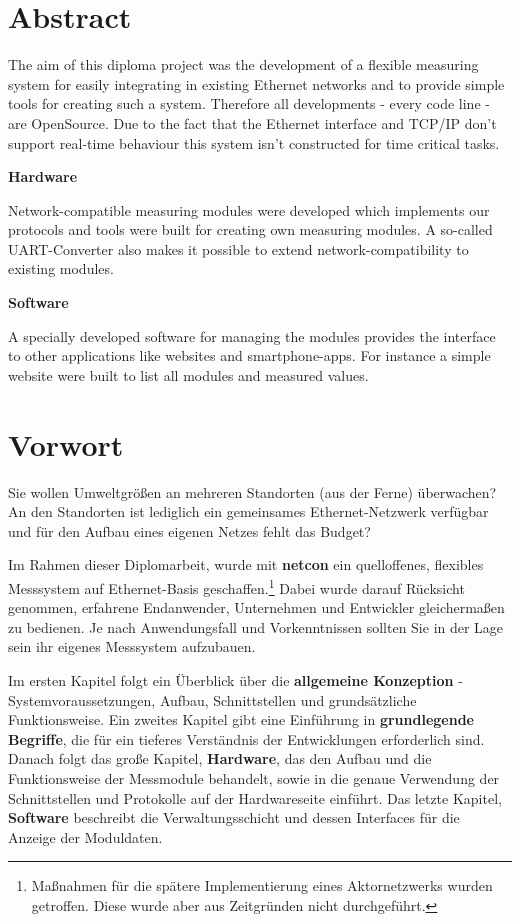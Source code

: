 \documentclass[a4paper,14pt,headsepline]{scrartcl}
\begin{document}
\section*{Abstract}
The aim of this diploma project was the development of a flexible measuring system for easily integrating in existing Ethernet networks and to provide simple tools for creating such a system. Therefore all developments - every code line - are OpenSource. Due to the fact that the Ethernet interface and TCP/IP don't support real-time behaviour this system isn't constructed for time critical tasks. 

\textbf{Hardware}

Network-compatible measuring modules were developed which implements our protocols and tools were built for creating own measuring modules. A so-called UART-Converter also makes it possible to extend network-compatibility to existing modules. 

\textbf{Software}

A specially developed software for managing the modules provides the interface to other applications like websites and smartphone-apps. For instance a simple website were built to list all modules and measured values.


\newpage

\section*{Vorwort}
Sie wollen Umweltgrößen an mehreren Standorten (aus der Ferne) überwachen? An den Standorten ist lediglich ein gemeinsames Ethernet-Netzwerk verfügbar und für den Aufbau eines eigenen Netzes fehlt das Budget?

Im Rahmen dieser Diplomarbeit, wurde mit \textbf{netcon} ein quelloffenes, flexibles Messsystem auf Ethernet-Basis geschaffen.\footnote{Maßnahmen für die spätere Implementierung eines Aktornetzwerks wurden getroffen. Diese wurde aber aus Zeitgründen nicht durchgeführt. } Dabei wurde darauf Rücksicht genommen, erfahrene Endanwender, Unternehmen und Entwickler gleichermaßen zu bedienen. Je nach Anwendungsfall und Vorkenntnissen sollten Sie in der Lage sein ihr eigenes Messsystem aufzubauen. 

Im ersten Kapitel folgt ein Überblick über die \textbf{allgemeine Konzeption} - Systemvoraussetzungen, Aufbau, Schnittstellen und grundsätzliche Funktionsweise. Ein zweites Kapitel gibt eine Einführung in \textbf{grundlegende Begriffe}, die für ein tieferes Verständnis der Entwicklungen erforderlich sind. Danach folgt das große Kapitel, \textbf{Hardware}, das den Aufbau und die Funktionsweise der Messmodule behandelt, sowie in die genaue Verwendung der Schnittstellen und Protokolle auf der Hardwareseite einführt. Das letzte Kapitel, \textbf{Software} beschreibt die Verwaltungsschicht und dessen Interfaces für die Anzeige der Moduldaten.
\end{document}

